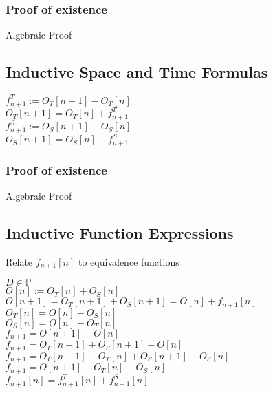 \documentclass[11pt]{article}
\begin{document}
\subsubsection{Proof of existence}
Algebraic Proof












\subsection{Inductive Space and Time Formulas}
\begin{center}
$
f^T_{n+1} := O_T[n+1] - O_T[n]
$
\\ \vspace{2mm}
$
O_T[n+1] = O_T[n] + f^T_{n+1}
$
\\ \vspace{2mm}
$
f^S_{n+1} := O_S[n+1] - O_S[n]
$
\\ \vspace{2mm}
$
O_S[n+1] = O_S[n] + f^S_{n+1}
$

\end{center}

\subsubsection{Proof of existence}
Algebraic Proof




\subsection{Inductive Function Expressions}
Relate $f_{n+1}[n]$ to equivalence functions
\begin{center}
$
D \in \mathbb{P}
$
\\ \vspace{2mm}
$
O[n] := O_T[n] + O_S[n]
$
\\ \vspace{2mm}
$
O[n+1] = O_T[n+1] + O_S[n+1] = O[n] + f_{n+1}[n]
$
\\ \vspace{2mm}
$
O_T[n] = O[n] - O_S[n]
$
\\ \vspace{2mm}
$
O_S[n] = O[n] - O_T[n]
$
\\ \vspace{8mm}
$
f_{n+1} = O[n+1] - O[n]
$
\\ \vspace{2mm}
$
f_{n+1} = O_T[n+1] + O_S[n+1] - O[n]
$
\\ \vspace{2mm}
$
f_{n+1} = O_T[n+1] - O_T[n] + O_S[n+1] - O_S[n]
$
\\ \vspace{2mm}
$
f_{n+1} = O[n+1] - O_T[n] - O_S[n]
$
\\ \vspace{2mm}
$
f_{n+1}[n] =  f^T_{n+1}[n] +  f^S_{n+1}[n]
$
\end{center}
\end{document}

